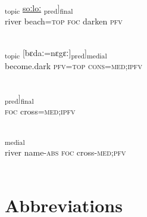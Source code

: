 \documentclass[output=paper]{LSP/langsci}
\begin{document}
\begin{appendixexe}
 \ex \label{Aiex:App49}
\gll [[haːnɛ	sɛː=jaː]\textsubscript{topic}	\underline{\smash{[kaː}}	\underline{soːloː}	\underline{\smash{di]}}\textsubscript{pred}]\textsubscript{final}\\
river	beach=\textsc{top}	\textsc{foc}	darken	\textsc{pfv}\\
\glt {}\\
\end{appendixexe}

\begin{appendixexe}
 \ex \label{Aiex:App50}
\gll [[\textbf{[soːlo}	\textbf{di=jaː]}\textsubscript{pred}]\textsubscript{topic}	[bɛdaː=nɛgɛː]\textsubscript{pred}]\textsubscript{medial}\\
become.dark	\textsc{pfv}=\textsc{top}	\textsc{cons}=\textsc{med};\textsc{ipfv}\\
\glt {}\\
\end{appendixexe}

\begin{appendixexe}
 \ex \label{Aiex:App51}
\gll \underline{\smash{[[kaː}}	\underline{\smash{taː=nɛgɛː]}}\textsubscript{pred}]\textsubscript{final}\\
\textsc{foc}	cross=\textsc{med;ipfv}\\
\glt {}\\
\end{appendixexe}

\begin{appendixexe}
 \ex \label{Aiex:App52}
\textsubscript{medial}\\
river	name-\textsc{abs}	\textsc{foc}	cross-\textsc{med};\textsc{pfv}\\
\glt {}\\
\end{appendixexe}

\section*{ Abbreviations}
\end{document}
